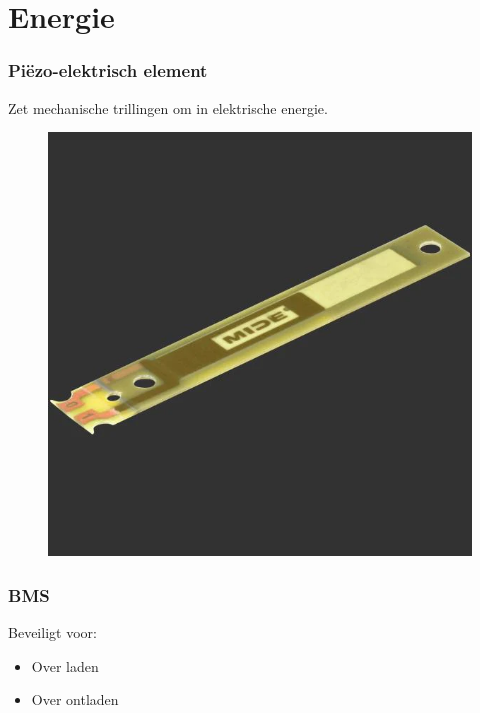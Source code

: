 \section{Energie}
    \begin{frame}
        \frametitle{Piëzo-elektrisch element}
    
        Zet mechanische trillingen om in elektrische energie.
        \begin{figure}[ht]
            \centering
            \includegraphics[scale=0.2]{img/peizo.png}
        \end{figure}


    \end{frame}
    \begin{frame}
        \frametitle{BMS}
    
        Beveiligt voor:
        \begin{itemize}
            \item Over laden
            \item Over ontladen
        \end{itemize}
    
    \end{frame}
    
        
    
